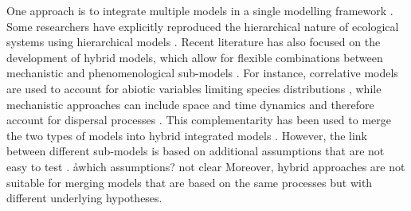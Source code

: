 One approach is to integrate multiple models in a single modelling framework \citep{Buckley2010}. 
Some researchers have explicitly reproduced the hierarchical nature of ecological systems using hierarchical models \citep[e.g.][]{Royale2008, Catterall2012, Strigul2012, Stewart-Koster2013, Soranno2014}. 
Recent literature has also focused on the development of hybrid models, which allow for flexible combinations between mechanistic and phenomenological sub-models \citep{Gallien2010, Franklin2010, Thuiller2013}. 
For instance, correlative models are used to account for abiotic variables limiting species distributions \citep{Guisan2005}, while mechanistic approaches can include space and time dynamics and therefore account for dispersal processes \citep{Kearney2008}. 
This complementarity has been used to merge the two types of models into hybrid integrated models \citep[e.g.][]{Keith2008, Anderson2009, Smolik2010, Boulangeat2014}. 
However, the link between different sub-models is based on additional assumptions that are not easy to test \citep{Gallien2010}. 
\aa{which assumptions? not clear}
Moreover, hybrid approaches are not suitable for merging models that are based on the same processes but with different underlying hypotheses.


